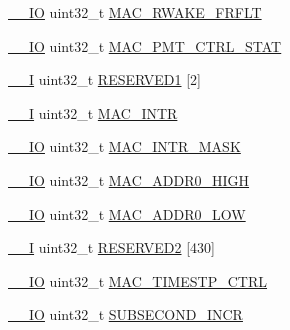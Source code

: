 \begin{DoxyCompactItemize}
\item 
\hyperlink{core__sc300_8h_aec43007d9998a0a0e01faede4133d6be}{\+\_\+\+\_\+\+IO} uint32\+\_\+t \hyperlink{struct_l_p_c___e_n_e_t___t_a074c138d1896840cf6c12a1492148915}{M\+A\+C\+\_\+\+R\+W\+A\+K\+E\+\_\+\+F\+R\+F\+LT}
\item 
\hyperlink{core__sc300_8h_aec43007d9998a0a0e01faede4133d6be}{\+\_\+\+\_\+\+IO} uint32\+\_\+t \hyperlink{struct_l_p_c___e_n_e_t___t_a578e6763265829224162083d04acf339}{M\+A\+C\+\_\+\+P\+M\+T\+\_\+\+C\+T\+R\+L\+\_\+\+S\+T\+AT}
\item 
\hyperlink{core__sc300_8h_af63697ed9952cc71e1225efe205f6cd3}{\+\_\+\+\_\+I} uint32\+\_\+t \hyperlink{struct_l_p_c___e_n_e_t___t_a67272bc257c032693d52097a78451784}{R\+E\+S\+E\+R\+V\+E\+D1} \mbox{[}2\mbox{]}
\item 
\hyperlink{core__sc300_8h_af63697ed9952cc71e1225efe205f6cd3}{\+\_\+\+\_\+I} uint32\+\_\+t \hyperlink{struct_l_p_c___e_n_e_t___t_a77a888f784437c7309c4b287f8d262c4}{M\+A\+C\+\_\+\+I\+N\+TR}
\item 
\hyperlink{core__sc300_8h_aec43007d9998a0a0e01faede4133d6be}{\+\_\+\+\_\+\+IO} uint32\+\_\+t \hyperlink{struct_l_p_c___e_n_e_t___t_a882b735620b7b7b0c332c0687c9e00ca}{M\+A\+C\+\_\+\+I\+N\+T\+R\+\_\+\+M\+A\+SK}
\item 
\hyperlink{core__sc300_8h_aec43007d9998a0a0e01faede4133d6be}{\+\_\+\+\_\+\+IO} uint32\+\_\+t \hyperlink{struct_l_p_c___e_n_e_t___t_a32e472e346b959e30ee434c9d51999dd}{M\+A\+C\+\_\+\+A\+D\+D\+R0\+\_\+\+H\+I\+GH}
\item 
\hyperlink{core__sc300_8h_aec43007d9998a0a0e01faede4133d6be}{\+\_\+\+\_\+\+IO} uint32\+\_\+t \hyperlink{struct_l_p_c___e_n_e_t___t_afe7b152952c2c359db31a4387e8aedb3}{M\+A\+C\+\_\+\+A\+D\+D\+R0\+\_\+\+L\+OW}
\item 
\hyperlink{core__sc300_8h_af63697ed9952cc71e1225efe205f6cd3}{\+\_\+\+\_\+I} uint32\+\_\+t \hyperlink{struct_l_p_c___e_n_e_t___t_a382eb02b18eca8227ecf59f2895f498e}{R\+E\+S\+E\+R\+V\+E\+D2} \mbox{[}430\mbox{]}
\item 
\hyperlink{core__sc300_8h_aec43007d9998a0a0e01faede4133d6be}{\+\_\+\+\_\+\+IO} uint32\+\_\+t \hyperlink{struct_l_p_c___e_n_e_t___t_a6dbd0f1df5e15eddacea0d28f9f623c8}{M\+A\+C\+\_\+\+T\+I\+M\+E\+S\+T\+P\+\_\+\+C\+T\+RL}
\item 
\hyperlink{core__sc300_8h_aec43007d9998a0a0e01faede4133d6be}{\+\_\+\+\_\+\+IO} uint32\+\_\+t \hyperlink{struct_l_p_c___e_n_e_t___t_a8cfa1fac247a4eb2a1c409b087e5868e}{S\+U\+B\+S\+E\+C\+O\+N\+D\+\_\+\+I\+N\+CR}
\item 

\end{DoxyCompactItemize}
